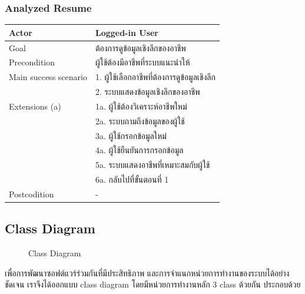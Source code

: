 \subsubsection{Analyzed Resume}
\begin{table}[H]
    \begin{tabular*}{\textwidth}{l|l} \hline
      Actor                 & Logged-in User                  \\ \hline
      Goal                  & ต้องการดูข้อมูลเชิงลึกของอาชีพ         \\ \hline
      Precondition          & ผู้ใช้ต้องมีอาชีพที่ระบบแนะนำให้          \\ \hline
      Main success scenario & 1. ผู้ใช้เลือกอาชีพที่ต้องการดูข้อมูลเชิงลึก \\
                            & 2. ระบบแสดงข้อมูลเชิงลึกของอาชีพ     \\ \hline
      Extensions (a)        & 1a. ผู้ใช้ต้องวิเคราะห์อาชีพใหม่        \\
                            & 2a. ระบบถามถึงข้อมูลของผู้ใช้         \\
                            & 3a. ผู้ใช้กรอกข้อมูลใหม่              \\
                            & 4a. ผู้ใช้ยืนยันการกรอกข้อมูล          \\
                            & 5a. ระบบแสดงอาชีพที่เหมาะสมกับผู้ใช้   \\
                            & 6a. กลับไปที่ขั้นตอนที่ 1              \\ \hline
      Postcodition          & -                               \\ \hline
  \end{tabular*}
\end{table}

\subsection{Class Diagram}
\begin{figure}[H]\centering
    \setlength{\fboxrule}{0.2mm} %
    \setlength{\fboxsep}{0.5cm}
    \caption{Class Diagram}\label{fig:class_diagram}
\end{figure}
เพื่อการพัฒนาซอฟต์แวร์ร่วมกันที่มีประสิทธิภาพ และการจำแนกหน่วยการทำงานของระบบได้อย่างชัดเจน เราจึงได้ออกแบบ class diagram โดยมีหน่วยการทำงานหลัก 3 class ด้วยกัน ประกอบด้วย

